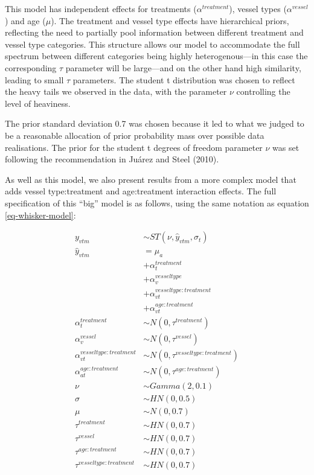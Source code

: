 \documentclass[
  letterpaper,
  DIV=11,
  numbers=noendperiod,
  oneside]{scrartcl}
\theoremstyle{plain}
\theoremstyle{remark}
\begin{document}
This model has independent effects for treatments
(\(\alpha^{treatment}\)), vessel types (\(\alpha^{vessel}\)) and age
(\(\mu\)). The treatment and vessel type effects have hierarchical
priors, reflecting the need to partially pool information between
different treatment and vessel type categories. This structure allows
our model to accommodate the full spectrum between different categories
being highly heterogenous---in this case the corresponding \(\tau\)
parameter will be large---and on the other hand high similarity, leading
to small \(\tau\) parameters. The student t distribution was chosen to
reflect the heavy tails we observed in the data, with the parameter
\(\nu\) controlling the level of heaviness.

The prior standard deviation 0.7 was chosen because it led to what we
judged to be a reasonable allocation of prior probability mass over
possible data realisations. The prior for the student t degrees of
freedom parameter \(\nu\) was set following the recommendation in Juárez
and Steel (2010).

As well as this model, we also present results from a more complex model
that adds vessel type:treatment and age:treatment interaction effects.
The full specification of this ``big'' model is as follows, using the
same notation as equation \eqref{eq-whisker-model}:

\begin{align}
y_{vtm} &\sim ST(\nu, \hat{y}_{vtm}, \sigma_{t}) \label{eq-whisker-model-interaction} \\
\hat{y}_{vtm} &= \mu_a \nonumber \\
  &+ \alpha^{treatment}_{t} \nonumber \\
  &+ \alpha^{vesseltype}_v \nonumber \\
  &+ \alpha^{vesseltype:treatment}_{vt} \nonumber \\
  &+ \alpha^{age:treatment}_{vt} \nonumber \\
\alpha^{treatment}_t &\sim N(0, \tau^{treatment}) \nonumber \\
\alpha^{vessel}_v &\sim N(0, \tau^{vessel}) \nonumber \\
\alpha^{vesseltype:treatment}_{vt} &\sim N(0, \tau^{vesseltype:treatment}) \nonumber \\
\alpha^{age:treatment}_{at} &\sim N(0, \tau^{age:treatment}) \nonumber \\
\nu &\sim Gamma(2, 0.1) \nonumber \\
\sigma &\sim HN(0, 0.5) \nonumber \\
\mu &\sim N(0, 0.7) \nonumber \\
\tau^{treatment} &\sim HN(0, 0.7) \nonumber \\
\tau^{vessel} &\sim HN(0, 0.7) \nonumber \\
\tau^{age:treatment} &\sim HN(0, 0.7) \nonumber \\
\tau^{vesseltype:treatment} &\sim HN(0, 0.7) \nonumber 
\end{align}
\end{document}
